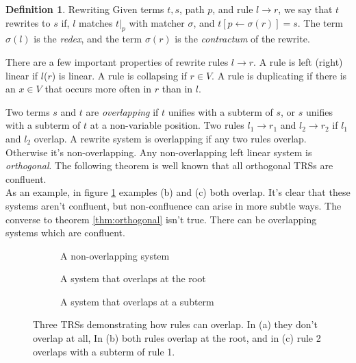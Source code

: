 \documentclass{article}
\theoremstyle{definition}
\newtheorem{definition}{Definition}[section]
\begin{document}
\theoremstyle{definition}
\begin{definition}{Rewriting}
Given terms $t,s$, path $p$, and rule $l \to r$, we say that $t$ rewrites to $s$ if, 
$l$ matches $t|_p$ with matcher $\sigma$, and $t[p \leftarrow \sigma(r)] = s$.
The term $\sigma(l)$ is the \textit{redex}, and the term $\sigma(r)$ is the \textit{contractum}
of the rewrite.
\end{definition}

There are a few important properties of rewrite rules $l \to r$.
A rule is left (right) linear if $l$($r$) is linear.
A rule is collapsing if $r \in V$.
A rule is duplicating if there is an $x \in V$ that occurs more often in $r$ than in $l$.

Two terms $s$ and $t$ are \textit{overlapping} if $t$ unifies with a subterm of $s$,
or $s$ unifies with a subterm of $t$ at a non-variable position.
Two rules $l_1 \to r_1$ and $l_2 \to r_2$ if $l_1$ and $l_2$ overlap.
A rewrite system is overlapping if any two rules overlap.  Otherwise it's non-overlapping.
Any non-overlapping left linear system is \textit{orthogonal}.
The following theorem is well known that all orthogonal TRSs are confluent. \cite{AdvancedTRS}\\

As an example, in figure \ref{fig:overlap} examples (b) and (c) both overlap.
It's clear that these systems aren't confluent,
but non-confluence can arise in more subtle ways.
The converse to theorem \ref{thm:orthogonal} isn't true. There can be overlapping systems which are confluent.

\begin{figure}[h]
    \begin{subfigure}{.29\textwidth}
    \caption{A non-overlapping system}
    \end{subfigure}
    \begin{subfigure}{.29\textwidth}
    \caption{A system that overlaps at the root}
    \end{subfigure}
    \begin{subfigure}{.29\textwidth}
    \caption{A system that overlaps at a subterm}
    \end{subfigure}
    \label{fig:overlap}
    \caption{Three TRSs demonstrating how rules can overlap.
            In (a) they don't overlap at all,
            In (b) both rules overlap at the root,
            and in (c) rule 2 overlaps with a subterm of rule 1.}
\end{figure}
\end{document}
